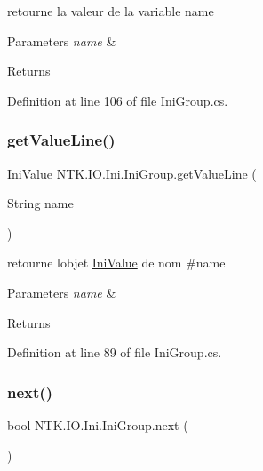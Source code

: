 retourne la valeur de la variable {\ttfamily name} 


\begin{DoxyParams}{Parameters}
{\em name} & \\
\hline
\end{DoxyParams}
\begin{DoxyReturn}{Returns}

\end{DoxyReturn}


Definition at line 106 of file Ini\+Group.\+cs.

\mbox{\label{class_n_t_k_1_1_i_o_1_1_ini_1_1_ini_group_a5090c7ed734ea691b6f8f53bda852d84}} 
\subsubsection{\texorpdfstring{getValueLine()}{getValueLine()}}
{\footnotesize\ttfamily \mbox{\hyperlink{class_n_t_k_1_1_i_o_1_1_ini_1_1_ini_value}{Ini\+Value}} N\+T\+K.\+I\+O.\+Ini.\+Ini\+Group.\+get\+Value\+Line (\begin{DoxyParamCaption}\item[{String}]{name }\end{DoxyParamCaption})}



retourne l\textquotesingle{}objet {\ttfamily \mbox{\hyperlink{class_n_t_k_1_1_i_o_1_1_ini_1_1_ini_value}{Ini\+Value}}} de nom \#name 


\begin{DoxyParams}{Parameters}
{\em name} & \\
\hline
\end{DoxyParams}
\begin{DoxyReturn}{Returns}

\end{DoxyReturn}


Definition at line 89 of file Ini\+Group.\+cs.

\mbox{\label{class_n_t_k_1_1_i_o_1_1_ini_1_1_ini_group_a60d6cd4e4d115b4e296737d18a549c4a}} 
\subsubsection{\texorpdfstring{next()}{next()}}
{\footnotesize\ttfamily bool N\+T\+K.\+I\+O.\+Ini.\+Ini\+Group.\+next (\begin{DoxyParamCaption}{ }\end{DoxyParamCaption})}



